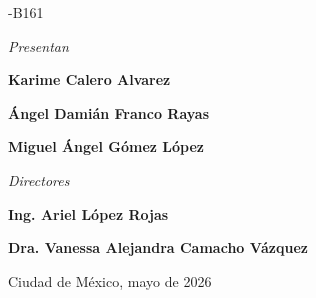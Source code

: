 \begin{titlepage}
\begin{center}
        \vspace{0.8cm}

        {\fontsize{14}{17}-B161\par}

        \vfill

        {\fontsize{14}{17}\selectfont\itshape Presentan\par}
        \vspace{0.2cm}
        {\fontsize{14}{17}\selectfont\bfseries Karime Calero Alvarez\par}
        \vspace{0.2cm}
        {\fontsize{14}{17}\selectfont\bfseries Ángel Damián Franco Rayas\par}
        \vspace{0.2cm}
        {\fontsize{14}{17}\selectfont\bfseries Miguel Ángel Gómez López\par}

        \vspace{1.4cm}

        {\fontsize{14}{17}\selectfont\itshape Directores\par}

        \vspace{0.8cm}

        \begin{minipage}{0.42\textwidth}
            \centering
            {\fontsize{14}{17}\selectfont\bfseries Ing. Ariel López Rojas\par}
        \end{minipage}
        \hfill
        \begin{minipage}{0.42\textwidth}
            \centering
            {\fontsize{14}{17}\selectfont\bfseries Dra. Vanessa Alejandra Camacho Vázquez \par}
        \end{minipage}

        \vfill

        {\fontsize{12}{14}\selectfont Ciudad de México, mayo de 2026\par}
    \end{center}
\end{titlepage}